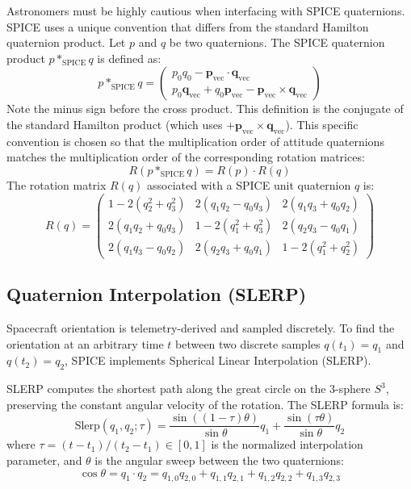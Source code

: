\documentclass{acta}
\begin{document}
Astronomers must be highly cautious when interfacing with SPICE quaternions. SPICE uses a unique convention that differs from the standard Hamilton quaternion product. Let $p$ and $q$ be two quaternions. The SPICE quaternion product $p *_{\text{SPICE}} q$ is defined as:
\begin{equation}
p *_{\text{SPICE}} q = \begin{pmatrix} p_0 q_0 - \mathbf{p}_{\text{vec}} \cdot \mathbf{q}_{\text{vec}} \\ p_0 \mathbf{q}_{\text{vec}} + q_0 \mathbf{p}_{\text{vec}} - \mathbf{p}_{\text{vec}} \times \mathbf{q}_{\text{vec}} \end{pmatrix}
\end{equation}
Note the minus sign before the cross product. This definition is the conjugate of the standard Hamilton product (which uses $+ \mathbf{p}_{\text{vec}} \times \mathbf{q}_{\text{vec}}$). This specific convention is chosen so that the multiplication order of attitude quaternions matches the multiplication order of the corresponding rotation matrices:
\begin{equation}
R(p *_{\text{SPICE}} q) = R(p) \cdot R(q)
\end{equation}
The rotation matrix $R(q)$ associated with a SPICE unit quaternion $q$ is:
\begin{equation}
R(q) = \begin{pmatrix} 
1 - 2(q_2^2 + q_3^2) & 2(q_1 q_2 - q_0 q_3) & 2(q_1 q_3 + q_0 q_2) \\ 
2(q_1 q_2 + q_0 q_3) & 1 - 2(q_1^2 + q_3^2) & 2(q_2 q_3 - q_0 q_1) \\ 
2(q_1 q_3 - q_0 q_2) & 2(q_2 q_3 + q_0 q_1) & 1 - 2(q_1^2 + q_2^2) 
\end{pmatrix}
\end{equation}

\subsection{Quaternion Interpolation (SLERP)}
Spacecraft orientation is telemetry-derived and sampled discretely. To find the orientation at an arbitrary time $t$ between two discrete samples $q(t_1) = q_1$ and $q(t_2) = q_2$, SPICE implements Spherical Linear Interpolation (SLERP).

SLERP computes the shortest path along the great circle on the 3-sphere $S^3$, preserving the constant angular velocity of the rotation. The SLERP formula is:
\begin{equation}
\text{Slerp}(q_1, q_2; \tau) = \frac{\sin((1-\tau)\theta)}{\sin\theta} q_1 + \frac{\sin(\tau\theta)}{\sin\theta} q_2
\end{equation}
where $\tau = (t - t_1)/(t_2 - t_1) \in [0, 1]$ is the normalized interpolation parameter, and $\theta$ is the angular sweep between the two quaternions:
\begin{equation}
\cos\theta = q_1 \cdot q_2 = q_{1,0}q_{2,0} + q_{1,1}q_{2,1} + q_{1,2}q_{2,2} + q_{1,3}q_{2,3}
\end{equation}
\end{document}

